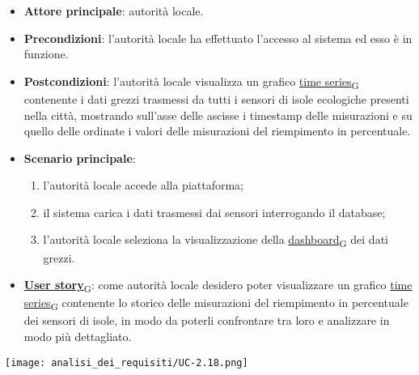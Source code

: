 \newpage
{}
\begin{itemize}
	\item \textbf{Attore principale}: autorità locale.
	\item \textbf{Precondizioni}: l'autorità locale ha effettuato l'accesso al sistema ed esso è in funzione.
	\item \textbf{Postcondizioni}: l'autorità locale visualizza un grafico \href{https://7last.github.io/docs/pb/documentazione-interna/glossario\#time-series}{time series\textsubscript{G}} contenente i dati grezzi trasmessi da tutti i sensori di isole ecologiche presenti nella città, mostrando sull'asse delle ascisse i timestamp delle misurazioni e su quello delle ordinate i valori delle misurazioni del riempimento in percentuale.
	\item \textbf{Scenario principale}:
	      \begin{enumerate}
		      \item l'autorità locale accede alla piattaforma;
		      \item il sistema carica i dati trasmessi dai sensori interrogando il database;
		      \item l'autorità locale seleziona la visualizzazione della \href{https://7last.github.io/docs/pb/documentazione-interna/glossario\#dashboard}{dashboard\textsubscript{G}} dei dati grezzi.
	      \end{enumerate}
	\item \href{https://7last.github.io/docs/pb/documentazione-interna/glossario\#user-story}{\textbf{User story}\textsubscript{G}}:
	      come autorità locale desidero poter visualizzare un grafico \href{https://7last.github.io/docs/pb/documentazione-interna/glossario\#time-series}{time series\textsubscript{G}} contenente lo storico delle misurazioni del riempimento in percentuale
	      dei sensori di isole, in modo da poterli confrontare tra loro e analizzare in modo più dettagliato.
\end{itemize}
\begin{center}
	\texttt{[image: analisi\_dei\_requisiti/UC-2.18.png]}
\end{center}

